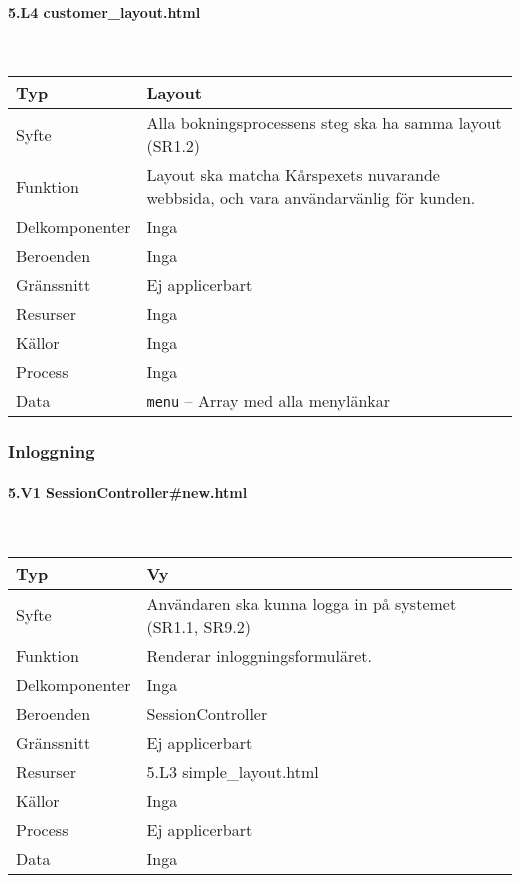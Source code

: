 \documentclass[a4paper, twoside, 11pt, titlepage]{article}
\begin{document}
			\paragraph{5.L4 customer\_layout.html}\

			\begin {table} [ht] \begin{tabular} {  p{3.5cm} p{9.6cm} }
				\hline
				{Typ} & {Layout} \\
				\hline
				{Syfte} & {Alla bokningsprocessens steg ska ha samma layout (SR1.2)} \\
				\hline
				{Funktion} & {Layout ska matcha Kårspexets nuvarande webbsida, och vara användarvänlig för kunden.} \\
				\hline
				{Delkomponenter} & {Inga} \\
				\hline
				{Beroenden} & {Inga} \\
				\hline
				{Gränssnitt} & {Ej applicerbart} \\
				\hline
				{Resurser} & {Inga} \\
				\hline
				{Källor} & {Inga} \\
				\hline
				{Process} & {Inga} \\
				\hline
				{Data} & {{\tt menu} – Array med alla menylänkar} \\
				\hline
			\end{tabular} \end{table} \FloatBarrier


		\subsubsection{Inloggning}



			\paragraph{5.V1 SessionController\#new.html}\

			\begin {table} [ht] \begin{tabular} {  p{3.5cm} p{9.6cm} }
				\hline
				{Typ} & {Vy} \\
				\hline
				{Syfte} & {Användaren ska kunna logga in på systemet (SR1.1, SR9.2)} \\
				\hline
				{Funktion} & {Renderar inloggningsformuläret.} \\
				\hline
				{Delkomponenter} & {Inga} \\
				\hline
				{Beroenden} & {SessionController} \\
				\hline
				{Gränssnitt} & {Ej applicerbart} \\
				\hline
				{Resurser} & {5.L3 simple\_layout.html} \\
				\hline
				{Källor} & {Inga} \\
				\hline
				{Process} & {Ej applicerbart} \\
				\hline
				{Data} & {Inga} \\
				\hline
			\end{tabular} \end{table} \FloatBarrier
\end{document}
